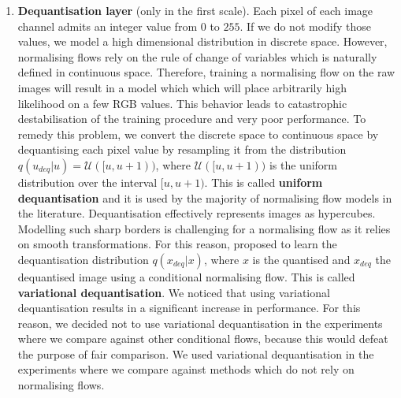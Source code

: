\begin{enumerate}
    \item \textbf{Dequantisation layer} (only in the first scale). Each pixel of each image channel admits an integer value from $0$ to $255$. If we do not modify those values, we model a high dimensional distribution in discrete space. However, normalising flows rely on the rule of change of variables which is naturally defined in continuous space. Therefore, training a normalising flow on the raw images will result in a model which which will place arbitrarily high likelihood on a few RGB values. This behavior leads to catastrophic destabilisation of the training procedure and very poor performance. To remedy this problem, we convert the discrete space to continuous space by dequantising each pixel value by resampling it from the distribution $q(u_{deq}|u)=\mathcal{U}([u,u+1))$, where $\mathcal{U}([u,u+1))$ is the uniform distribution over the interval $[u,u+1)$. This is called \textbf{uniform dequantisation} and it is used by the majority of normalising flow models in the literature. Dequantisation effectively represents images as hypercubes. Modelling such sharp borders is challenging for a normalising flow as it relies on smooth transformations. For this reason, \cite{ho2019flow++} proposed to learn the dequantisation distribution $q(x_{deq}|x)$, where $x$ is the quantised and $x_{deq}$ the dequantised image using a conditional normalising flow. This is called \textbf{variational dequantisation}. We noticed that using variational dequantisation results in a significant increase in performance. For this reason, we decided not to use variational dequantisation in the experiments where we compare against other conditional flows, because this would defeat the purpose of fair comparison. We used variational dequantisation in the experiments where we compare against methods which do not rely on normalising flows.
    

\end{enumerate}
